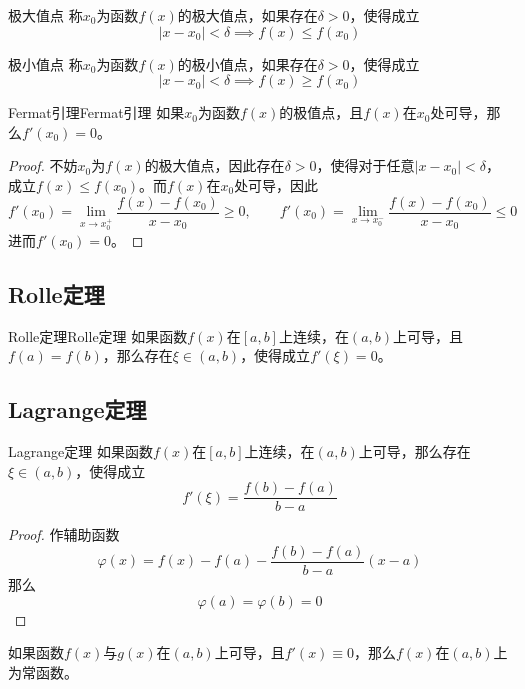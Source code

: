 \documentclass[lang = cn, scheme = chinese, thmcnt = section]{elegantbook}
\begin{document}
\begin{definition}{极大值点}
	称$x_0$为函数$f(x)$的极大值点，如果存在$\delta>0$，使得成立
	$$
	|x-x_0|<\delta\implies
	f(x)\le f(x_0)
	$$
\end{definition}

\begin{definition}{极小值点}
	称$x_0$为函数$f(x)$的极小值点，如果存在$\delta>0$，使得成立
	$$
	|x-x_0|<\delta\implies
	f(x)\ge f(x_0)
	$$
\end{definition}

\begin{theorem}{Fermat引理}{Fermat引理}
	如果$x_0$为函数$f(x)$的极值点，且$f(x)$在$x_0$处可导，那么$f'(x_0)=0$。
\end{theorem}

\begin{proof}
	 不妨$x_0$为$f(x)$的极大值点，因此存在$\delta>0$，使得对于任意$|x-x_0|<\delta$，成立$f(x)\le f(x_0)$。而$f(x)$在$x_0$处可导，因此
	 $$
	 f'(x_0)=\lim_{x\to x_0^+}\frac{f(x)-f(x_0)}{x-x_0}\ge 0,\qquad
	 f'(x_0)=\lim_{x\to x_0^-}\frac{f(x)-f(x_0)}{x-x_0}\le 0
	 $$
	 进而$f'(x_0)=0$。
\end{proof}

\subsection{Rolle定理}

\begin{theorem}{Rolle定理}{Rolle定理}
	如果函数$f(x)$在$[a,b]$上连续，在$(a,b)$上可导，且$f(a)=f(b)$，那么存在$\xi\in (a,b)$，使得成立$f'(\xi)=0$。
\end{theorem}

\subsection{Lagrange定理}

\begin{theorem}{Lagrange定理}
	如果函数$f(x)$在$[a,b]$上连续，在$(a,b)$上可导，那么存在$\xi\in (a,b)$，使得成立
	$$
	f'(\xi)=\frac{f(b)-f(a)}{b-a}
	$$
\end{theorem}

\begin{proof}
	作辅助函数
	$$
	\varphi(x)=f(x)-f(a)-\frac{f(b)-f(a)}{b-a}(x-a)
	$$
	那么
	$$
	\varphi(a)=\varphi(b)=0
	$$
\end{proof}

\begin{corollary}
	如果函数$f(x)$与$g(x)$在$(a,b)$上可导，且$f'(x)\equiv0$，那么$f(x)$在$(a,b)$上为常函数。
\end{corollary}
\end{document}

